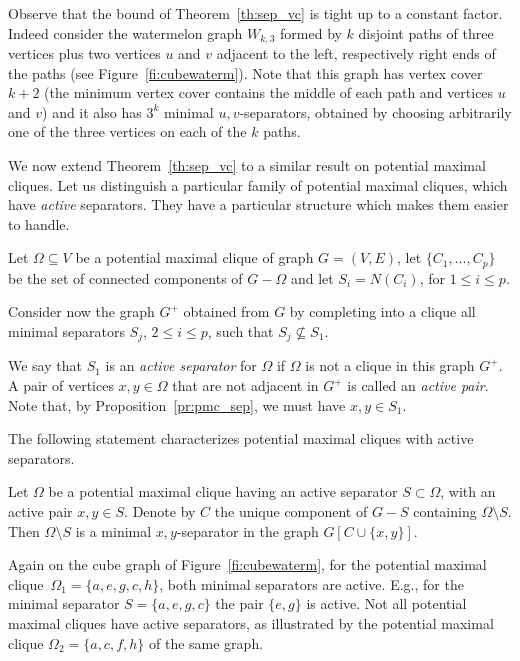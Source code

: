 \documentclass{llncs}
\newcommand{\pmc}{potential maximal clique}
\begin{document}
Observe that the bound of Theorem~\ref{th:sep_vc} is tight up to a constant factor. Indeed consider the watermelon graph $W_{k,3}$  formed by $k$ disjoint paths of three vertices plus two vertices $u$ and $v$ adjacent to the left, respectively right ends of the paths (see Figure~\ref{fi:cubewaterm}). Note that this graph has vertex cover $k+2$ (the minimum vertex cover contains the middle of each path and vertices $u$ and $v$) and it also has $3^{k}$ minimal $u,v$-separators, obtained by choosing arbitrarily one of the three vertices on each of the $k$ paths. 


 


We now extend Theorem~\ref{th:sep_vc} to a similar result on \pmc s. Let us distinguish a particular family of potential maximal cliques, which have \emph{active} separators. They have a particular structure which makes them easier to handle.

\begin{definition}\label{de:active}
Let $\Omega \subseteq V$ be a potential maximal clique of graph $G=(V,E)$, let 
  $ \{ C_1, \ldots, C_p\}$ be the set of 
connected components of $G -  \Omega$ and let $S_i = N(C_i)$, for $1 \leq i \leq p$.

Consider now the graph $G^+$ obtained from $G$ by completing into a clique all minimal separators $S_j$, $2 \leq i \leq p$, such that $S_j \not\subseteq S_1$.

We say that $S_1$ is an \emph{active separator} for $\Omega$ if $\Omega$  is not a clique in this graph $G^+$. A pair of vertices $x,y \in \Omega$ that are not adjacent in $G^+$ is called an \emph{active pair}. Note that, by Proposition~\ref{pr:pmc_sep}, we must have $x,y \in S_1$. 
\end{definition}

The following statement characterizes potential maximal cliques with active separators.

\begin{proposition}\label{pr:pmc_active}
Let $\Omega$ be a potential maximal clique having an active separator $S \subset \Omega$, with an active pair $x,y \in S$. Denote by $C$ the unique component of $G - S$ containing $\Omega \setminus S$. Then $\Omega \setminus S$ is a minimal $x,y$-separator in the graph $G[C \cup \{x,y\}]$. 
\end{proposition}

Again on the cube graph of Figure~\ref{fi:cubewaterm}, for the \pmc\ $\Omega_1 = \{ a,e,g,c,h\}$, both minimal separators are active. E.g., for the minimal separator $S = \{a,e,g,c\}$ the pair $\{e,g\}$ is active. Not all potential maximal cliques have active separators, as illustrated by the potential maximal clique $\Omega_2 = \{a,c,f,h\}$ of the same graph.
\end{document}
